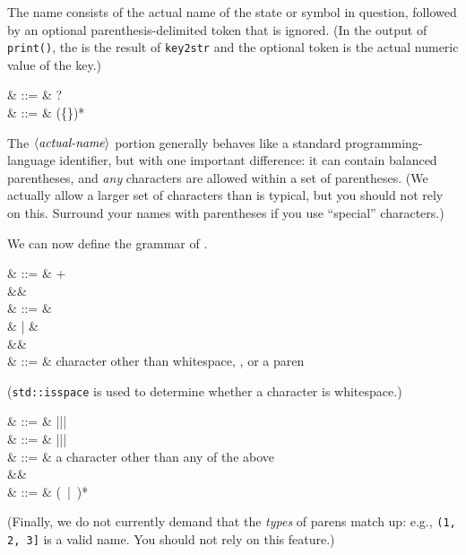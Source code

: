 The name consists of the actual name of the state or symbol
in question, followed by an optional parenthesis-delimited token that
is ignored. (In the output of \texttt{print()}, the  is the result of
\texttt{key2str} and the optional token is the actual numeric value of
the key.)

\begin{grammar}
   & ::= &  \cfgsp  {}? \\
   & ::= & \term{(}\cfgsp(\neg\{\term{(}\})*\cfgsp\term{)}
\end{grammar}

The $\langle\textit{actual-name}\rangle$ portion generally behaves like a standard
programming-language identifier, but with one important difference: it can
contain
balanced parentheses, and \emph{any} characters are allowed within a
set of parentheses. (We actually allow a larger set of characters than
is typical, but you should not rely on this. Surround your names
with parentheses if you use ``special'' characters.)

We can now define the grammar of .

\begin{grammar}
   & ::= &  + \\
&& \\
   & ::= &   \\
                 &   | &   \\
&& \\
  & ::= &  \textrm{character other than whitespace, \term{,}, or a paren}
\end{grammar}

(\texttt{std::isspace} is used to determine whether a character is
  whitespace.)

\begin{grammar}
    & ::= &  \term{(}\cfgsp |\cfgsp \term{\{}\cfgsp |\cfgsp \term{[}\cfgsp |\cfgsp \term{$<$} \\
   & ::= &  \term{)}\cfgsp |\cfgsp \term{\}}\cfgsp |\cfgsp \term{]}\cfgsp |\cfgsp \term{$>$} \\
   & ::= &  \textrm{a character other than any of the above} \\
&& \\
  & ::= &  \cfgsp  (\ |\ )*\cfgsp  {}
\end{grammar}

(Finally, we do not currently demand that the \emph{types} of parens
  match up: e.g., \texttt{(1, 2, 3]} is a valid name. You should not
    rely on this feature.)
